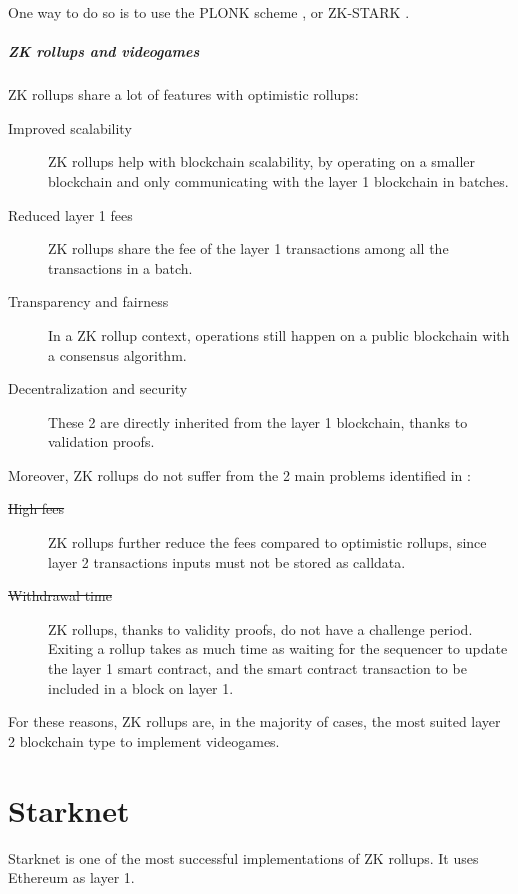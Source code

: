 \documentclass[11pt]{article}
\begin{document}
One way to do so is to use the PLONK scheme \cite{plonk}, or ZK-STARK \cite{zk-stark}.

\subsubsection{ZK rollups and videogames} \label{subsubsection:zkrav}
ZK rollups share a lot of features with optimistic rollups:
\begin{description}
    \item[Improved scalability] ZK rollups help with blockchain scalability, by operating on a smaller blockchain and only communicating with the layer 1 blockchain in batches.
    \item[Reduced layer 1 fees] ZK rollups share the fee of the layer 1 transactions among all the transactions in a batch.
    \item[Transparency and fairness] In a ZK rollup context, operations still happen on a public blockchain with a consensus algorithm.
    \item[Decentralization and security] These 2 are directly inherited from the layer 1 blockchain, thanks to validation proofs. 
\end{description}

Moreover, ZK rollups do not suffer from the 2 main problems identified in :
\begin{description}
    \item[\st{High fees}] ZK rollups further reduce the fees compared to optimistic rollups, since layer 2 transactions inputs must not be stored as calldata.
    \item[\st{Withdrawal time}] ZK rollups, thanks to validity proofs, do not have a challenge period. Exiting a rollup takes as much time as waiting for the sequencer to update the layer 1 smart contract, and the smart contract transaction to be included in a block on layer 1.  
\end{description}

For these reasons, ZK rollups are, in the majority of cases, the most suited layer 2 blockchain type to implement videogames.

\newpage
\part{Starknet} \label{part:starknet}
Starknet is one of the most successful implementations of ZK rollups. It uses Ethereum as layer 1.
\end{document}
